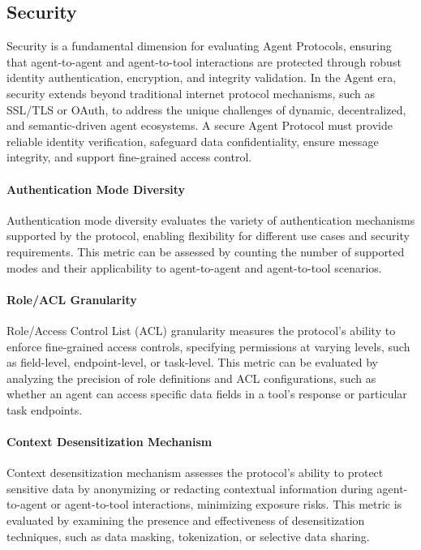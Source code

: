 \documentclass[10pt,preprint]{article}
\begin{document}
\subsection{Security}
Security is a fundamental dimension for evaluating Agent Protocols, ensuring that agent-to-agent and agent-to-tool interactions are protected through robust identity authentication, encryption, and integrity validation. In the Agent era, security extends beyond traditional internet protocol mechanisms, such as SSL/TLS or OAuth, to address the unique challenges of dynamic, decentralized, and semantic-driven agent ecosystems. A secure Agent Protocol must provide reliable identity verification, safeguard data confidentiality, ensure message integrity, and support fine-grained access control.

\paragraph{Authentication Mode Diversity} Authentication mode diversity evaluates the variety of authentication mechanisms supported by the protocol, enabling flexibility for different use cases and security requirements. This metric can be assessed by counting the number of supported modes and their applicability to agent-to-agent and agent-to-tool scenarios.

\paragraph{Role/ACL Granularity} Role/Access Control List (ACL) granularity measures the protocol’s ability to enforce fine-grained access controls, specifying permissions at varying levels, such as field-level, endpoint-level, or task-level. This metric can be evaluated by analyzing the precision of role definitions and ACL configurations, such as whether an agent can access specific data fields in a tool’s response or particular task endpoints.

\paragraph{Context Desensitization Mechanism} Context desensitization mechanism assesses the protocol’s ability to protect sensitive data by anonymizing or redacting contextual information during agent-to-agent or agent-to-tool interactions, minimizing exposure risks. This metric is evaluated by examining the presence and effectiveness of desensitization techniques, such as data masking, tokenization, or selective data sharing.
\end{document}
